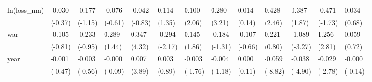 \begin{tabular}{p{1.5cm} p{1.7cm} p{1.7cm} p{1.7cm} p{1.7cm} p{1.7cm} p{1.7cm} p{1.7cm} p{1.7cm} p{1.7cm} p{1.7cm} p{1.7cm} p{1.7cm}}
\hline
ln(loss\_nm)     &   -0.030         &   -0.177         &   -0.076         &   -0.042         &    0.114         &    0.100\sym{*}  &    0.280\sym{**} &    0.014         &    0.428\sym{*}  &    0.387         &   -0.471         &    0.034         \\
                &  (-0.37)         &  (-1.15)         &  (-0.61)         &  (-0.83)         &   (1.35)         &   (2.06)         &   (3.21)         &   (0.14)         &   (2.46)         &   (1.87)         &  (-1.73)         &   (0.68)         \\
war             &   -0.105         &   -0.233         &    0.289         &    0.347\sym{***}&   -0.294\sym{*}  &    0.145         &   -0.184         &   -0.107         &    0.221         &   -1.089\sym{**} &    1.256\sym{**} &    0.059         \\
                &  (-0.81)         &  (-0.95)         &   (1.44)         &   (4.32)         &  (-2.17)         &   (1.86)         &  (-1.31)         &  (-0.66)         &   (0.80)         &  (-3.27)         &   (2.81)         &   (0.72)         \\
year            &   -0.001         &   -0.003         &   -0.000         &    0.007\sym{***}&    0.003         &   -0.003         &   -0.004         &    0.000         &   -0.059\sym{***}&   -0.038\sym{***}&   -0.029\sym{**} &   -0.000         \\
                &  (-0.47)         &  (-0.56)         &  (-0.09)         &   (3.89)         &   (0.89)         &  (-1.76)         &  (-1.18)         &   (0.11)         &  (-8.82)         &  (-4.90)         &  (-2.78)         &  (-0.14)         \\
\end{tabular}
